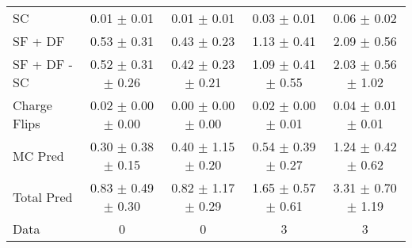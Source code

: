 \begin{tabular}{l|cccc}
                                 SC &  0.01 $\pm$  0.01 &  0.01 $\pm$  0.01 &  0.03 $\pm$  0.01 &  0.06 $\pm$  0.02 \\
                            SF + DF &  0.53 $\pm$  0.31 &  0.43 $\pm$  0.23 &  1.13 $\pm$  0.41 &  2.09 $\pm$  0.56 \\
\hline
                       SF + DF - SC &  0.52 $\pm$  0.31 $\pm$  0.26 &  0.42 $\pm$  0.23 $\pm$  0.21 &  1.09 $\pm$  0.41 $\pm$  0.55 &  2.03 $\pm$  0.56 $\pm$  1.02 \\
\hline\hline
                       Charge Flips &  0.02 $\pm$  0.00 $\pm$  0.00 &  0.00 $\pm$  0.00 $\pm$  0.00 &  0.02 $\pm$  0.00 $\pm$  0.01 &  0.04 $\pm$  0.01 $\pm$  0.01 \\
\hline
                            MC Pred &  0.30 $\pm$  0.38 $\pm$  0.15 &  0.40 $\pm$  1.15 $\pm$  0.20 &  0.54 $\pm$  0.39 $\pm$  0.27 &  1.24 $\pm$  0.42 $\pm$  0.62 \\
\hline
                         Total Pred &  0.83 $\pm$  0.49 $\pm$  0.30 &  0.82 $\pm$  1.17 $\pm$  0.29 &  1.65 $\pm$  0.57 $\pm$  0.61 &  3.31 $\pm$  0.70 $\pm$  1.19 \\
\hline\hline
                               Data &     0 &     0 &     3 &     3 \\
\hline\hline
\end{tabular}

